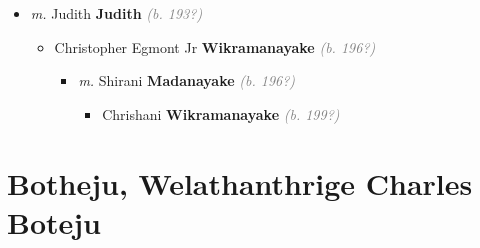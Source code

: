 \documentclass[10pt, openany]{book}
\begin{document}
\begin{itemize}
{\begin{itemize}
{\begin{itemize}
\item{\textit{m.} Judith \textbf{Judith} \textcolor{gray}{\textit{(b. 193?)}}   \label{couple:00004175:00004176} \begin{itemize}
\item{Christopher Egmont Jr \textbf{Wikramanayake} \textcolor{gray}{\textit{(b. 196?)}}
\begin{itemize}
\item{\textit{m.} Shirani \textbf{Madanayake} \textcolor{gray}{\textit{(b. 196?)}}   \label{couple:00004177:00004178} \begin{itemize}
\item{Chrishani \textbf{Wikramanayake} \textcolor{gray}{\textit{(b. 199?)}}
 }
\end{itemize}}
\end{itemize}
   }
\end{itemize}}
\end{itemize}
 }
\end{itemize}}
\end{itemize}
  
\part{Botheju, Welathanthrige Charles Boteju}
\end{document}
